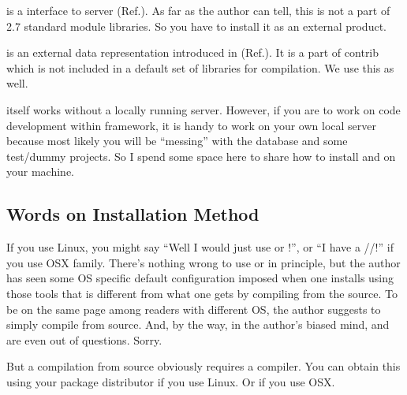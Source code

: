 
{\psycopg} is a {\python} interface to {\psql} server (Ref.\cite{Psycopg2}). 
As far as the author can tell, this is not a part of {\python} 2.7 standard module 
libraries. So you have to install it as an external product.

{\hstore} is an external data representation introduced in {\psql} (Ref.\cite{HSTORE}).
It is a part of {\psql} {\ttfamily contrib} which is not included in a default set
of libraries for compilation. We use this as well.

{\pubs} itself works without a locally running {\psql} server. 
However, if you are to work on code development within {\pubs} framework, it is handy
to work on your own local {\psql} server because most likely you will be ``messing''
with the database and some test/dummy projects. So I spend some space here to
share how to install {\psql} and {\psycopg} on your machine. 

\subsection{Words on Installation Method}
If you use Linux, you might say ``Well I would just use {\aptget} or {\yum}!'', or 
``I have a {\fink}/{\brew}/{\macport}!'' if you use OSX family.
There's nothing wrong to use {\aptget} or {\yum} in principle, but the author has
seen some OS specific default configuration imposed when one installs using those
tools that is different from what one gets by compiling from the source. 
To be on the same page among readers with different OS, the author suggests to 
simply compile from source. And, by the way, in the author's biased mind, {\fink} 
and {\brew} are even out of questions. Sorry.

But a compilation from source obviously requires a compiler. You can obtain this 
using your package distributor if you use Linux. Or {\xcode} if you use OSX.

